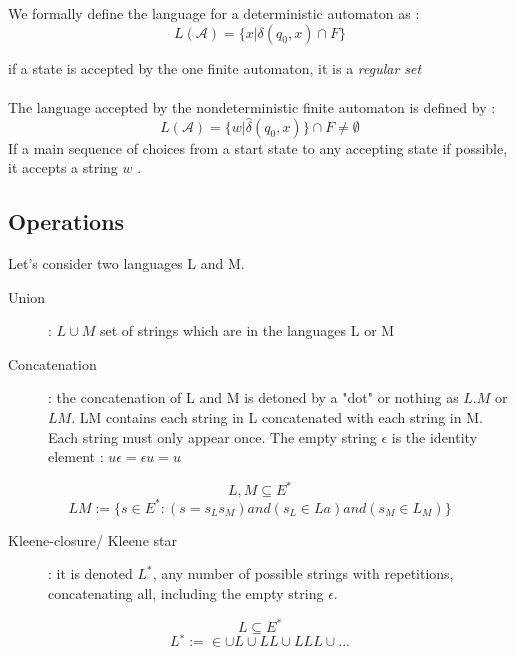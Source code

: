 We formally define the language for a deterministic automaton as :\\
\begin{equation*}
L(\mathcal{A}) = \{x|\delta(q_0,x) \cap F\}
\end{equation*}

if a state is accepted by the one finite automaton, it is a \textit{regular set} \\
\\
The language accepted by the nondeterministic finite automaton is defined by : 
\begin{equation*}
L(\mathcal{A}) = \{w|\widehat{\delta}(q_0,x)\} \cap F \neq \emptyset
\end{equation*}
If a main sequence of choices from a start state to any accepting state if possible, it accepts a string $w$ .

\subsection{Operations} 

Let's consider two languages L and M.\\
\begin{description}
\item [Union] : $L \cup M$ set of strings which are in the languages L or M
\item [Concatenation] : the concatenation of L and M is detoned by a "dot" or nothing as $L.M$ or $LM$. LM contains each string in L concatenated with each string in M. Each string must only appear once. The empty string $\epsilon$ is the identity element : $u \epsilon = \epsilon u = u$
\end{description}
\begin{equation*}
L,M \subseteq E^*
\end{equation*}
\begin{equation*}
LM := \{s \in E^*: (s = s_Ls_M) and (s_L ∈ La) and (s_M \in L_M)\}
\end{equation*}

\begin{description}
\item [Kleene-closure/ Kleene star] : it is denoted $L^*$, any number of possible strings  with repetitions, concatenating all, including the empty string $\epsilon$.
\end{description}
\begin{equation*}
L \subseteq E^*
\end{equation*}
\begin{equation*}
L^∗ := {\in} \cup L \cup LL \cup LLL \cup ...
\end{equation*}

